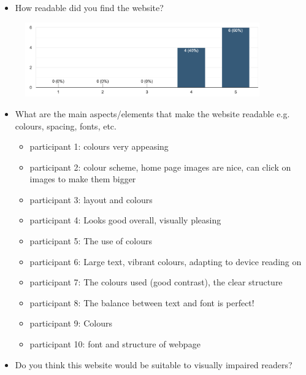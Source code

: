\documentclass[letterpaper,12pt]{article}
\begin{document}
\begin{appendices}
\begin{itemize}
    \item How readable did you find the website?
\end{itemize}

\begin{figure}[h] 
\centerline{\includegraphics[width=0.9\textwidth]{report/images/user-survey-site-readability.png}}
{\label{fig:user-survey-site-readability}}
\end{figure}

\begin{itemize}
    \item What are the main aspects/elements that make the website readable e.g. colours, spacing, fonts, etc.
    \begin{itemize}
        \item 	participant 1: 	colours very appeasing 
    \item 	participant 2: 	colour scheme, home page images are nice, can click on images to make them bigger
    \item 	participant 3: 	layout and colours
    \item 	participant 4: 	Looks good overall, visually pleasing
    \item 	participant 5: 	The use of colours 
    \item 	participant 6: 	Large text, vibrant colours, adapting to device reading on
    \item 	participant 7: 	The colours used (good contrast), the clear structure
    \item 	participant 8: 	The balance between text and font is perfect!
    \item 	participant 9: 	Colours
    \item 	participant 10: 	font and structure of webpage
    \end{itemize}
\end{itemize}

\begin{itemize}
    \item Do you think this website would be suitable to visually impaired readers?
\end{itemize}


\end{appendices}
\end{document}
